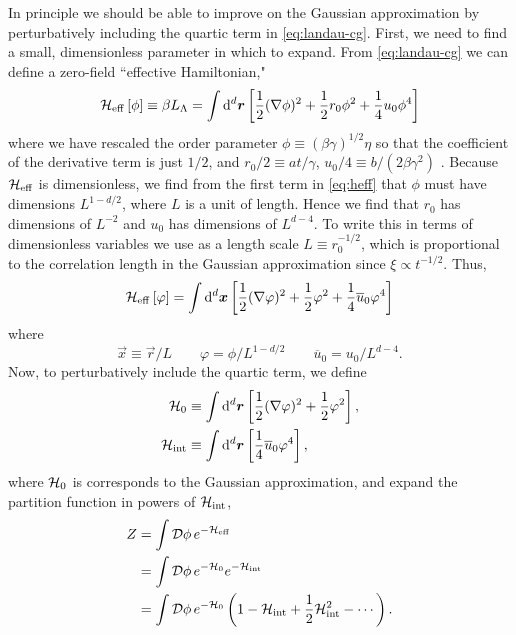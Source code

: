 In principle we should be able to improve on the Gaussian approximation by
perturbatively including the quartic term in \cref{eq:landau-cg}. First, we
need to find a small, dimensionless parameter in which to expand. From
\cref{eq:landau-cg} we can define a zero-field ``effective Hamiltonian,"
\begin{equation}
  \mathcal{H}_{\mathrm{eff}}\left[\phi\right]
  \equiv \beta L_{\Lambda}
  = \int \mathop{}\!\mathrm{d}^d \bm{r} \left[
    \frac{1}{2}(\nabla\phi)^2 +
    \frac{1}{2} r_0 \phi^2 +
    \frac{1}{4} u_0 \phi^4\right]
  \label{eq:heff}
\end{equation}
where we have rescaled the order parameter
$\phi \equiv (\beta\gamma)^{1/2}\eta$
so that the coefficient of the derivative term is just $1/2$, and
$r_0/2 \equiv a t/\gamma$,
$u_0/4 \equiv b/(2 \beta \gamma^2)$
\autocite{goldenfeld1992lectures}.
Because $\mathcal{H}_{\mathrm{eff}}$ is dimensionless, we find from the first term in
\cref{eq:heff} that $\phi$ must have dimensions $L^{1-d/2}$, where $L$ is a
unit of length. Hence we find that $r_0$ has dimensions of $L^{-2}$ and $u_0$
has dimensions of $L^{d-4}$. To write this in terms of dimensionless variables
we use as a length scale $L \equiv r_0^{-1/2}$, which is proportional to the
correlation length in the Gaussian approximation since $\xi \propto t^{-1/2}$.
Thus,
\begin{equation}
  \mathcal{H}_{\mathrm{eff}}\left[\varphi\right]
  = \int \mathop{}\!\mathrm{d}^d \bm{x}
    \left[
      \frac{1}{2}
      (\nabla\varphi)^2 +
      \frac{1}{2} \varphi^2 +
      \frac{1}{4} \overline{u}_0 \varphi^4\right]
\end{equation}
where
\begin{equation}
  \vec{x}\equiv\vec{r}/L\qquad
  \varphi = \phi/L^{1-d/2}\qquad
  \overline{u}_0 = u_0/L^{d-4}.
\end{equation}
Now, to perturbatively include the quartic term, we define
\begin{align}
  \mathcal{H}_0  &\equiv \int\mathop{}\!\mathrm{d}^d\bm{r}\left[\frac{1}{2}(\nabla\varphi)^2 + \frac{1}{2} \varphi^2\right], \\
  \mathcal{H}_{\mathrm{int}} &\equiv \int\mathop{}\!\mathrm{d}^d\bm{r}\left[\frac{1}{4} \overline{u}_0 \varphi^4\right],
  \label{eq:ham-int}
\end{align}
where $\mathcal{H}_0$ is corresponds to the Gaussian approximation, and expand the
partition function in powers of $\mathcal{H}_{\mathrm{int}}$,
\begin{align*}
  Z
  &= \int\mathcal{D}\phi \, e^{-\mathcal{H}_{\mathrm{eff}}} \\
  &= \int\mathcal{D}\phi \, e^{-\mathcal{H}_0} e^{-\mathcal{H}_{\mathrm{int}}} \\
  &= \int\mathcal{D}\phi \, e^{-\mathcal{H}_0} \left(1 - \mathcal{H}_{\mathrm{int}} + \frac{1}{2} \mathcal{H}_{\mathrm{int}}^2 - \cdots\right).
\end{align*}
